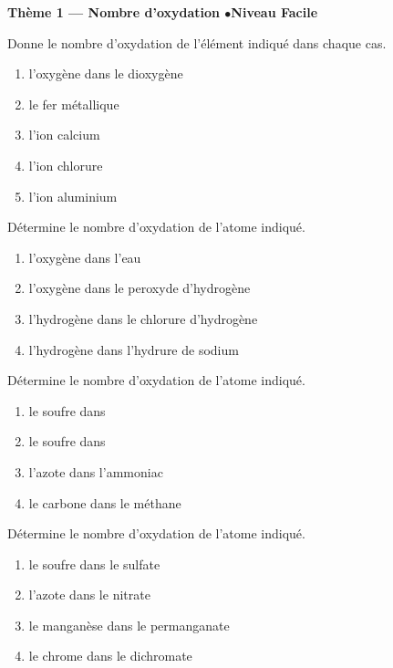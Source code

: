 \documentclass[11pt,a4paper]{article}
\begin{document}
\begin{center}\color{primarydark}\large\bfseries Thème 1 — Nombre d'oxydation \quad$\bullet$\quad Niveau Facile\end{center}

\begin{exo}
Donne le nombre d'oxydation de l'élément indiqué dans chaque cas.
\begin{enumerate}[label=\alph*)]
  \item l'oxygène dans le dioxygène 
  \item le fer métallique 
  \item l'ion calcium 
  \item l'ion chlorure 
  \item l'ion aluminium 
\end{enumerate}
\end{exo}

\begin{exo}
Détermine le nombre d'oxydation de l'atome indiqué.
\begin{enumerate}[label=\alph*)]
  \item l'oxygène dans l'eau 
  \item l'oxygène dans le peroxyde d'hydrogène 
  \item l'hydrogène dans le chlorure d'hydrogène 
  \item l'hydrogène dans l'hydrure de sodium 
\end{enumerate}
\end{exo}

\begin{exo}
Détermine le nombre d'oxydation de l'atome indiqué.
\begin{enumerate}[label=\alph*)]
  \item le soufre dans 
  \item le soufre dans 
  \item l'azote dans l'ammoniac 
  \item le carbone dans le méthane 
\end{enumerate}
\end{exo}

\begin{exo}
Détermine le nombre d'oxydation de l'atome indiqué.
\begin{enumerate}[label=\alph*)]
  \item le soufre dans le sulfate 
  \item l'azote dans le nitrate 
  \item le manganèse dans le permanganate 
  \item le chrome dans le dichromate 
\end{enumerate}
\end{exo}
\end{document}
